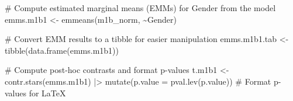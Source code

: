 \documentclass[
  bookmarksnumbered]{article}
\newenvironment{Shaded}{\begin{snugshade}}{\end{snugshade}}
\newcommand{\AttributeTok}[1]{\textcolor[rgb]{0.80,0.80,0.80}{#1}}
\newcommand{\CommentTok}[1]{\textcolor[rgb]{0.50,0.62,0.50}{#1}}
\newcommand{\FunctionTok}[1]{\textcolor[rgb]{0.94,0.94,0.56}{#1}}
\newcommand{\NormalTok}[1]{\textcolor[rgb]{0.80,0.80,0.80}{#1}}
\newcommand{\OtherTok}[1]{\textcolor[rgb]{0.94,0.94,0.56}{#1}}
\newcommand{\SpecialCharTok}[1]{\textcolor[rgb]{0.86,0.64,0.64}{#1}}
\begin{document}
\begin{Shaded}
\begin{Highlighting}[]
\CommentTok{\# Compute estimated marginal means (EMMs) for Gender from the model}
\NormalTok{emms.m1b1 }\OtherTok{\textless{}{-}} \FunctionTok{emmeans}\NormalTok{(m1b\_norm, }\SpecialCharTok{\textasciitilde{}}\NormalTok{Gender)}

\CommentTok{\# Convert EMM results to a tibble for easier manipulation}
\NormalTok{emms.m1b1.tab }\OtherTok{\textless{}{-}} \FunctionTok{tibble}\NormalTok{(}\FunctionTok{data.frame}\NormalTok{(emms.m1b1))}

\CommentTok{\# Compute post{-}hoc contrasts and format p{-}values}
\NormalTok{t.m1b1 }\OtherTok{\textless{}{-}} \FunctionTok{contr.stars}\NormalTok{(emms.m1b1) }\SpecialCharTok{|\textgreater{}}
  \FunctionTok{mutate}\NormalTok{(}\AttributeTok{p.value =} \FunctionTok{pval.lev}\NormalTok{(p.value)) }\CommentTok{\# Format p{-}values for LaTeX}


\end{Highlighting}
\end{Shaded}
\end{document}
